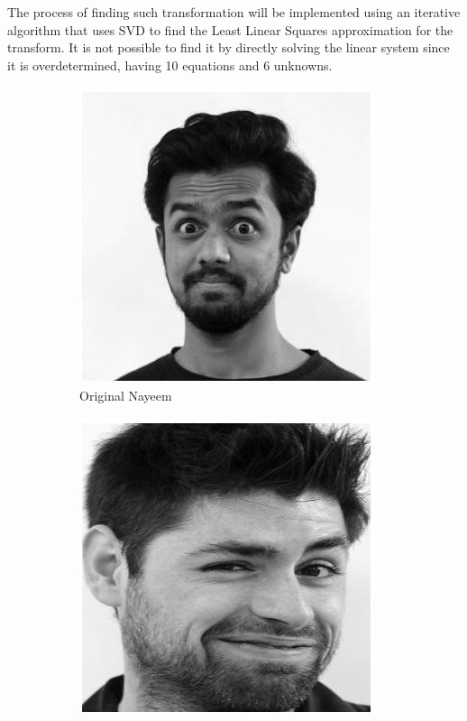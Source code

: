 \documentclass[12pt,a4paper,titlepage]{article}
\begin{document}
The process of finding such transformation will be implemented using an iterative algorithm that uses SVD to find the Least Linear Squares approximation for the transform. It is not possible to find it by directly solving the linear system since it is overdetermined, having 10 equations and 6 unknowns.

\begin{figure}[H]
	\centering
	\begin{subfigure}{0.3\columnwidth}
		\centering
		\includegraphics[width=\textwidth]{mapping1.jpg}
		\caption{Original Nayeem}
	\end{subfigure}
	\quad
	\begin{subfigure}{0.3\textwidth}
		\centering
		\includegraphics[width=\textwidth]{mapping3.jpg}

\end{subfigure}
\end{figure}
\end{document}
